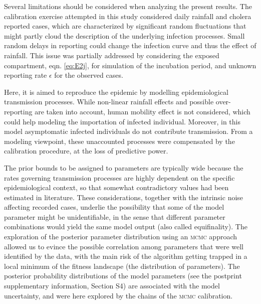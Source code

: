 Several limitations should be considered when analyzing the present results. The calibration exercise attempted in this study considered daily rainfall and cholera reported cases, which are characterized by significant random fluctuations that might partly cloud the description of the underlying infection processes. 
Small random delays in reporting could change the infection curve and thus the effect of rainfall. This issue was partially addressed by considering the exposed compartment, eqn. \eqref{eq:E2j}, for simulation of the incubation period, and unknown reporting rate $\epsilon$ for the observed cases.

Here, it is aimed to reproduce the epidemic by modelling epidemiological transmission processes. %
While non-linear rainfall effects and possible over-reporting are taken into account, human mobility effect\cite[-4\baselineskip]{Gatto:GeneralizedReproductionNumbers:2012,Bertuzzo:SpatiallyExplicitModels:2010,Mari:PredictiveAbilityMechanistic:2015,Perez-Saez:ClimatedrivenEndemicCholera:2017} is not considered, which could help modeling the importation of infected individual.  Moreover, in this model asymptomatic infected individuals do not contribute transmission. From a modeling viewpoint, these unaccounted processes were compensated by the calibration procedure, at the loss of predictive power.

The prior bounds to be assigned to parameters are typically wide\cite{Akman:ExaminationModelsCholera:2016} because the rates governing transmission processes are highly dependent on the specific epidemiological context, so that somewhat contradictory values had been estimated in literature. These considerations, together with the intrinsic noise affecting recorded cases, underlie the possibility that some of the model parameter might be unidentifiable\cite{Eisenberg:IdentifiabilityEstimationMultiple:2013}, in the sense that different parameter combinations would yield the same model output (also called equifinality). 
The exploration of the posterior parameter distribution using an \textsc{mcmc} approach allowed us to evince the possible correlation among parameters that were well identified by the data, with the main risk of the algorithm getting trapped in a local minimum of the fitness landscape (the distribution of parameters). The posterior probability distributions of the model parameters (see the postprint supplementary information, Section S4) are associated with the model uncertainty, and were here explored by the chains of the \textsc{mcmc} calibration.

